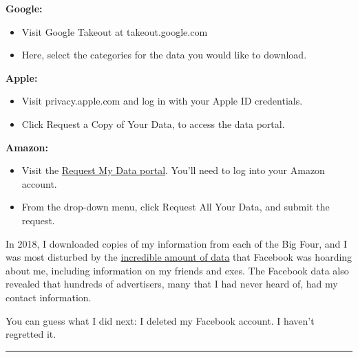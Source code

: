 \textbf{Google:}

\begin{itemize}
\tightlist
\item
  Visit Google Takeout at takeout.google.com
\end{itemize}

\begin{itemize}
\tightlist
\item
  Here, select the categories for the data you would like to download.
\end{itemize}

\textbf{Apple:}

\begin{itemize}
\tightlist
\item
  Visit privacy.apple.com and log in with your Apple ID credentials.
\end{itemize}

\begin{itemize}
\tightlist
\item
  Click Request a Copy of Your Data, to access the data portal.
\end{itemize}

\textbf{Amazon:}

\begin{itemize}
\tightlist
\item
  Visit the
  \href{https://www.amazon.com/gp/privacycentral/dsar/preview.html}{Request
  My Data portal}. You'll need to log into your Amazon account.
\end{itemize}

\begin{itemize}
\tightlist
\item
  From the drop-down menu, click Request All Your Data, and submit the
  request.
\end{itemize}

In 2018, I downloaded copies of my information from each of the Big
Four, and I was most disturbed by the
\href{https://www.nytimes3xbfgragh.onion/2018/04/11/technology/personaltech/i-downloaded-the-information-that-facebook-has-on-me-yikes.html}{incredible
amount of data} that Facebook was hoarding about me, including
information on my friends and exes. The Facebook data also revealed that
hundreds of advertisers, many that I had never heard of, had my contact
information.

You can guess what I did next: I deleted my Facebook account. I haven't
regretted it.

\begin{center}\rule{0.5\linewidth}{\linethickness}\end{center}

